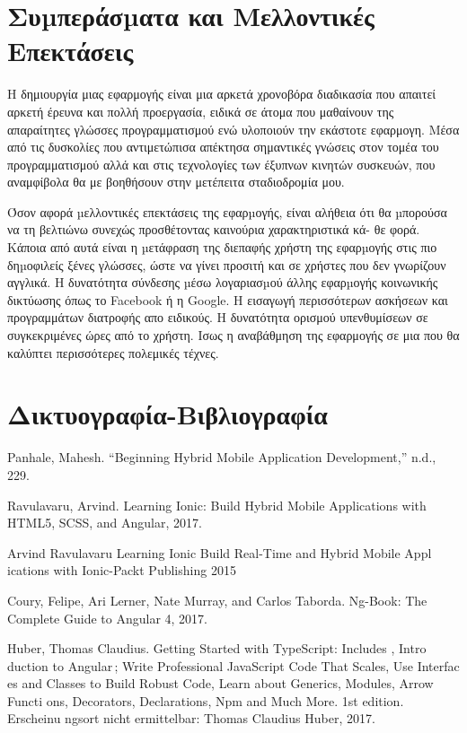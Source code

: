 \documentclass[a4paper,12pt]{article}
\begin{document}
		\clearpage
	
		\newpage
		\section{ Συµπεράσµατα και Μελλοντικές Επεκτάσεις}	

		Η δημιουργία μιας εφαρμογής είναι μια αρκετά
		χρονοβόρα διαδικασία που απαιτεί αρκετή έρευνα και πολλή προεργασία,
		ειδικά σε άτομα που μαθαίνουν της απαραίτητες γλώσσες προγραμματισμού ενώ υλοποιούν
		την εκάστοτε εφαρμογη. Μέσα από τις δυσκολίες που αντιμετώπισα απέκτησα σημαντικές γνώσεις
		στον τομέα του προγραμματισμού αλλά και στις τεχνολογίες των έξυπνων κινητών συσκευών, που αναμφίβολα
		θα με βοηθήσουν στην μετέπειτα σταδιοδρομία μου. 

		Όσον αφορά µελλοντικές επεκτάσεις της εφαρµογής, 
		είναι αλήθεια ότι θα µπορούσα να τη βελτιώνω συνεχώς προσθέτοντας 
		καινούρια χαρακτηριστικά κά-
		θε φορά. Κάποια από αυτά είναι η µετάφραση της 
		διεπαφής χρήστη της εφαρµογής στις πιο δηµοφιλείς ξένες γλώσσες, 
		ώστε να γίνει προσιτή και σε χρήστες που δεν γνωρίζουν αγγλικά. Η δυνατότητα σύνδεσης µέσω λογαριασµού 
		άλλης εφαρµογής κοινωνικής δικτύωσης όπως το  Facebook ή η Google. Η εισαγωγή περισσότερων ασκήσεων και προγραμμάτων
		διατροφής απο ειδικούς. Η δυνατότητα ορισμού υπενθυμίσεων σε συγκεκριμένες ώρες από το χρήστη. Ισως η αναβάθμηση της εφαρμογής σε μια που θα καλύπτει περισσότερες πολεμικές τέχνες.

		\clearpage
					
		\section{Δικτυογραφία-Βιβλιογραφία}
			Panhale, Mahesh. “Beginning Hybrid Mobile Application Development,” n.d., 229.

			Ravulavaru, Arvind. Learning Ionic: Build Hybrid Mobile Applications with HTML5, SCSS, and Angular, 2017.

			Arvind Ravulavaru Learning Ionic Build Real-Time and Hybrid 
			Mobile Appl
			ications with Ionic-Packt Publishing 2015
			
			Coury, Felipe, Ari Lerner, Nate Murray, and Carlos Taborda. Ng-Book: The Complete Guide to Angular 4, 2017.

			Huber, Thomas Claudius. Getting Started with TypeScript: Includes ,
			Intro
			duction to Angular ; Write Professional JavaScript Code That Scales, Use Interfac
			es and Classes to Build Robust Code, 
			Learn about Generics, Modules, Arrow Functi
			ons, Decorators, Declarations, Npm and Much More. 1st edition. 
			Erscheinu
			ngsort nicht ermittelbar: Thomas Claudius Huber, 2017.
\end{document}
